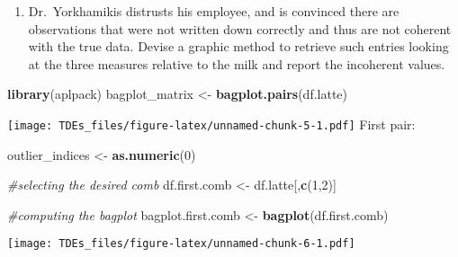 \documentclass[
]{article}
\newenvironment{Shaded}{\begin{snugshade}}{\end{snugshade}}
\newcommand{\CommentTok}[1]{\textcolor[rgb]{0.56,0.35,0.01}{\textit{#1}}}
\newcommand{\ControlFlowTok}[1]{\textcolor[rgb]{0.13,0.29,0.53}{\textbf{#1}}}
\newcommand{\DecValTok}[1]{\textcolor[rgb]{0.00,0.00,0.81}{#1}}
\newcommand{\FunctionTok}[1]{\textcolor[rgb]{0.13,0.29,0.53}{\textbf{#1}}}
\newcommand{\NormalTok}[1]{#1}
\newcommand{\OtherTok}[1]{\textcolor[rgb]{0.56,0.35,0.01}{#1}}
\newcommand{\SpecialCharTok}[1]{\textcolor[rgb]{0.81,0.36,0.00}{\textbf{#1}}}
\providecommand{\tightlist}{%
  \setlength{\itemsep}{0pt}\setlength{\parskip}{0pt}}
\begin{document}
\begin{enumerate}
\def\labelenumi{\arabic{enumi}.}
\tightlist
\item
  Dr.~Yorkhamikis distrusts his employee, and is convinced there are
  observations that were not written down correctly and thus are not
  coherent with the true data. Devise a graphic method to retrieve such
  entries looking at the three measures relative to the milk and report
  the incoherent values.
\end{enumerate}

\begin{Shaded}
\begin{Highlighting}[]
\FunctionTok{library}\NormalTok{(aplpack)}
\NormalTok{bagplot\_matrix }\OtherTok{\textless{}{-}} \FunctionTok{bagplot.pairs}\NormalTok{(df.latte)}
\end{Highlighting}
\end{Shaded}

\texttt{[image: TDEs\_files/figure-latex/unnamed-chunk-5-1.pdf]} First
pair:

\begin{Shaded}
\begin{Highlighting}[]
\NormalTok{outlier\_indices }\OtherTok{\textless{}{-}} \FunctionTok{as.numeric}\NormalTok{(}\DecValTok{0}\NormalTok{)}

\CommentTok{\#selecting the desired comb}
\NormalTok{df.first.comb }\OtherTok{\textless{}{-}}\NormalTok{ df.latte[,}\FunctionTok{c}\NormalTok{(}\DecValTok{1}\NormalTok{,}\DecValTok{2}\NormalTok{)]}

\CommentTok{\#computing the bagplot}
\NormalTok{bagplot.first.comb }\OtherTok{\textless{}{-}} \FunctionTok{bagplot}\NormalTok{(df.first.comb)}
\end{Highlighting}
\end{Shaded}

\texttt{[image: TDEs\_files/figure-latex/unnamed-chunk-6-1.pdf]}

\begin{Shaded}
\end{Shaded}
\end{document}
